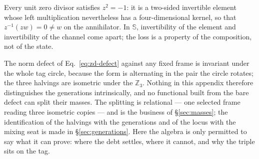 \begin{remark}
Every unit zero divisor satisfies $z^2 = -1$: it is a two-sided invertible element whose left
multiplication nevertheless has a four-dimensional kernel, so that $z^{-1}(zw) = 0 \neq w$ on the
annihilator. In $\mathbb{S}$, invertibility of the element and invertibility of the channel come
apart; the loss is a property of the composition, not of the state.
\end{remark}

\begin{remark}
The norm defect of Eq.~\eqref{eq:zd-defect} against any fixed frame is invariant under the whole
tag circle, because the form is alternating in the pair the circle rotates; the three halvings are
isometric under the $\mathbb{Z}_3$. Nothing in this appendix therefore distinguishes the
generations intrinsically, and no functional built from the bare defect can split their masses.
The splitting is relational --- one selected frame reading three isometric copies --- and is the
business of \S\ref{sec:masses}; the identification of the halvings with the generations and of the
locus with the mixing seat is made in \S\ref{sec:generations}. Here the algebra is only permitted
to say what it can prove: where the debt settles, where it cannot, and why the triple sits on the
tag.
\end{remark}

